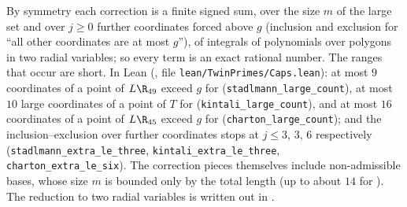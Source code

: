 By symmetry each correction is a finite signed sum, over the size $m$ of the
large set and over $j\ge0$ further coordinates forced above $g$ (inclusion and
exclusion for ``all other coordinates are at most $g$''), of integrals of
polynomials over polygons in two radial variables; so every term is an exact
rational number. The ranges that occur are short. In Lean
(, file \texttt{lean/TwinPrimes/Caps.lean}): at most $9$
coordinates of a point of $L\R_{49}$ exceed $g$ for \cite{Sta26}
(\texttt{stadlmann\_large\_count}), at most $10$ large coordinates of a point
of $T$ for \cite{Kin26} (\texttt{kintali\_large\_count}), and at most $16$
coordinates of a point of $L\R_{45}$ exceed $g$ for \cite{Cha26}
(\texttt{charton\_large\_count}); and the inclusion--exclusion over further
coordinates stops at $j\le3$, $3$, $6$ respectively
(\texttt{stadlmann\_extra\_le\_three}, \texttt{kintali\_extra\_le\_three},
\texttt{charton\_extra\_le\_six}). The correction pieces themselves include
non-admissible bases, whose size $m$ is bounded only by the total length (up
to about $14$ for \cite{Kin26}). The reduction to two radial variables is
written out in \cite[\S5]{Kim26}.

